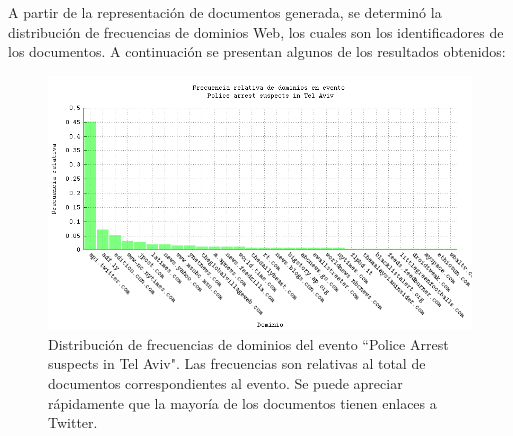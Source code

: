     A partir de la representación de documentos generada, se determinó
    la distribución de frecuencias de dominios Web, los cuales son los
    identificadores de los documentos. A continuación se presentan
    algunos de los resultados obtenidos:

\begin{figure}[h]
  \centering
  \includegraphics[width=14cm]{./img/telaviv-domain-freqs.png}
  \caption[Dominios evento 1]
   {Distribución de frecuencias de dominios del evento ``Police Arrest
  suspects in Tel Aviv"\label{fig:telaviv-domains}. Las frecuencias son relativas al total de
  documentos correspondientes al evento. Se puede apreciar rápidamente
  que la mayoría de los documentos tienen enlaces a Twitter.}
\end{figure}

